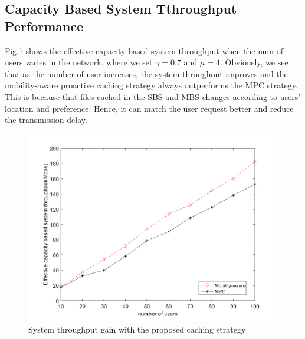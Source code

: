 \documentclass[conference]{IEEEtran}
\begin{document}
\subsection{Capacity Based System Tthroughput Performance}
  Fig.\ref{fig 3} shows the effective capacity based system throughput when the num of users varies in the network, where we set $\gamma=0.7$ and $\mu=4$. Obviously, we see that as the number of user increases, the system throughout improves and the mobility-aware proactive caching strategy always outperforms the MPC strategy. This is because that files cached in the SBS and MBS changes according to users’ location and preference. Hence, it can match the user request better and reduce the transmission delay.
\begin{figure}[htbp]
 \centerline{\includegraphics[scale=0.35]{fig3.png}}
 \caption{System throughput gain with the proposed caching strategy}
 \label{fig 3}
\end{figure}
\end{document}
